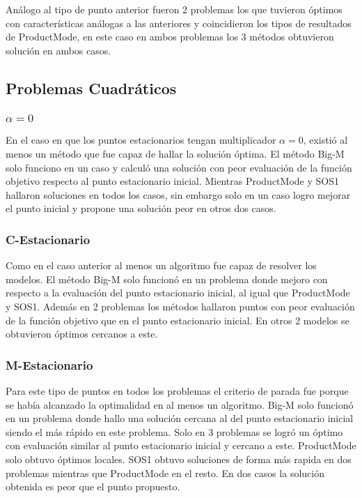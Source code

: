 Análogo al tipo de punto anterior  fueron 2 problemas los que tuvieron óptimos con características análogas a las anteriores y coincidieron los tipos de resultados de ProductMode, en este caso en ambos problemas los 3 métodos obtuvieron solución en ambos casos. 
   



\subsection{Problemas Cuadráticos}


\subsubsection{$\alpha =0$}
En el caso en que los puntos estacionarios tengan multiplicador $\alpha=0$, existió al menos un método que fue capaz de hallar la solución óptima. El método Big-M solo funciono en un caso y calculó una solución con peor evaluación de la función objetivo respecto al punto estacionario inicial. Mientras ProductMode y SOS1 hallaron soluciones en todos los casos, sin embargo solo en un caso logro mejorar el punto inicial y propone una solución peor en otros dos casos. 

\subsubsection{C-Estacionario}   
Como en  el caso anterior al menos un algoritmo fue capaz de resolver los modelos. 
El método Big-M solo funcionó en un problema donde mejoro con respecto a la evaluación del punto estacionario inicial, al igual que  ProductMode y SOS1. Además en 2 problemas los métodos hallaron puntos con peor evaluación de la función objetivo que en el punto estacionario inicial. En otros 2 modelos se obtuvieron óptimos cercanos a este.



    
\subsubsection{M-Estacionario}
  
Para este tipo de puntos en todos los problemas el criterio de parada fue porque se había alcanzado la optimalidad en al menos un algoritmo.
Big-M solo funcionó en un problema donde hallo una solución cercana al del punto estacionario inicial siendo el más rápido en este problema. Solo en 3 problemas  se logró  un óptimo con evaluación  similar al punto estacionario inicial  y   cercano a este. ProductMode solo obtuvo óptimos locales. SOS1 obtuvo soluciones de forma más rapida en dos problemas mientras que ProductMode en el resto. En dos casos la solución obtenida es peor que el punto propuesto.
    
